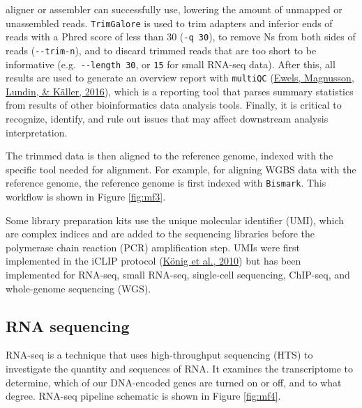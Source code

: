 \documentclass[12pt,twoside]{reedthesis}
\begin{document}
aligner or assembler can successfully use, lowering the amount of
unmapped or unassembled reads. \texttt{TrimGalore} is used to trim adapters and
inferior ends of reads with a Phred score of less than 30 (\texttt{-q\ 30}), to
remove Ns from both sides of reads (\texttt{-\/-trim-n}), and to discard trimmed
reads that are too short to be informative (e.g.~\texttt{-\/-length\ 30}, or \texttt{15}
for small RNA-seq data). After this, all results are used to generate an
overview report with \texttt{multiQC} (\protect\hyperlink{ref-ewels2016}{Ewels, Magnusson, Lundin, \& Käller, 2016}), which is a reporting tool
that parses summary statistics from results of other bioinformatics data
analysis tools. Finally, it is critical to recognize, identify, and rule
out issues that may affect downstream analysis interpretation.

The trimmed data is then aligned to the reference genome, indexed with
the specific tool needed for alignment. For example, for aligning WGBS
data with the reference genome, the reference genome is first indexed
with \texttt{Bismark}. This workflow is shown in Figure \ref{fig:mf3}.

Some library preparation kits use the unique molecular identifier (UMI),
which are complex indices and are added to the sequencing libraries
before the polymerase chain reaction (PCR) amplification step. UMIs were
first implemented in the iCLIP protocol (\protect\hyperlink{ref-kuxf6nig2010}{König et al., 2010}) but has been
implemented for RNA-seq, small RNA-seq, single-cell sequencing,
ChIP-seq, and whole-genome sequencing (WGS).

\hypertarget{m3.2}{%
\subsection*{RNA sequencing}\label{m3.2}}

RNA-seq is a technique that uses high-throughput
sequencing (HTS) to investigate the quantity and sequences of RNA. It
examines the transcriptome to determine, which of our DNA-encoded genes
are turned on or off, and to what degree. RNA-seq pipeline schematic is
shown in Figure \ref{fig:mf4}.
\end{document}
